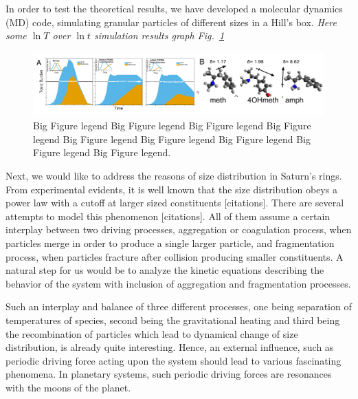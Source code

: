 \documentclass[11pt, notitlepage]{article} %
\begin{document}
In order to test the theoretical results, we have developed a molecular dynamics (MD) 
code, simulating granular particles of different sizes in a Hill's box. 
\emph{Here some $\ln T$ over $\ln t$ simulation results graph Fig.~\ref{fig2}}
\begin{figure}[b] %
	\centering
	\includegraphics[scale = .80]{Figures/Fig2.pdf}
	\caption{\footnotesize Big Figure legend Big Figure legend Big Figure legend Big Figure legend Big Figure legend Big Figure legend Big Figure legend Big Figure legend Big Figure legend.}
	\label{fig2}
\end{figure}

Next, we would like to address the reasons of size distribution in Saturn's rings. 
From experimental evidents, it is well known that the size distribution obeys a power
law with a cutoff at larger sized constituents [citations]. There are several attempts
to model this phenomenon [citations]. All of them assume a certain interplay between
two driving processes, aggregation or coagulation process, when particles merge in order 
to produce a single larger particle, and fragmentation process, when particles
fracture after collision producing smaller constituents. A natural step for us would be 
to analyze the kinetic equations describing the behavior of the system with inclusion 
of aggregation and fragmentation processes.

Such an interplay and balance of three different processes, one being separation of 
temperatures of species, second being the gravitational heating and third 
being the recombination of particles which lead to dynamical change of size distribution,
is already quite interesting. Hence, an external influence, such as periodic 
driving force acting upon the system should lead to various fascinating phenomena.
In planetary systems, such periodic driving forces are resonances with the moons of the 
planet.

\end{document}

